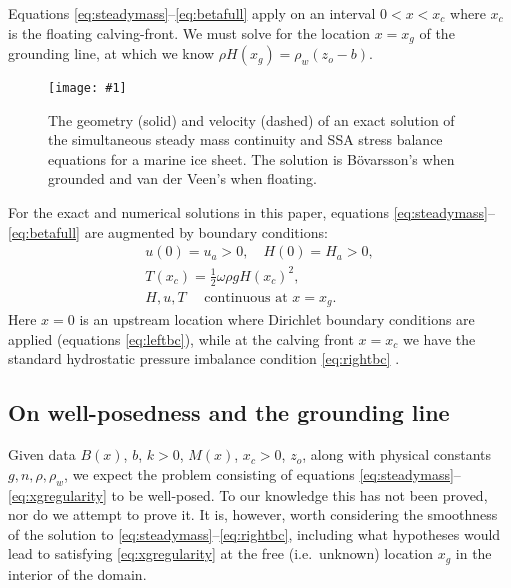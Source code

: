 \documentclass[twocolumn]{igs}
\renewcommand{\dh}{\fontencoding{T1}\selectfont{\symbol{240}}}
\newcommand{\onecol}[1]{\texttt{[image: \#1]}}
\newcommand{\bod}{B\"o\dh varsson\xspace}
\begin{document}
Equations \eqref{eq:steadymass}--\eqref{eq:betafull} apply on an interval $0 < x < x_c$ where $x_c$ is the floating calving-front.  We must solve for the location $x=x_g$ of the grounding line, at which we know $\rho H(x_g) = \rho_w (z_o - b)$.

\begin{figure}[ht]
\onecol{em-geometry}
\caption{The geometry (solid) and velocity (dashed) of an exact solution of the simultaneous steady mass continuity and SSA stress balance equations for a marine ice sheet.  The solution is \bod's when grounded and van der Veen's when floating.} \label{fig:exactmarine}
\end{figure}

For the exact and numerical solutions in this paper, equations \eqref{eq:steadymass}--\eqref{eq:betafull} are augmented by boundary conditions:
\begin{gather}
u(0) = u_a > 0, \quad H(0) = H_a > 0, \label{eq:leftbc} \\
T(x_c) = \frac{1}{2} \omega \rho g H(x_c)^2,  \label{eq:rightbc} \\
H, u, T \quad \text{ continuous at } x = x_g.  \label{eq:xgregularity}
\end{gather}
Here $x=0$ is an upstream location where Dirichlet boundary conditions are applied (equations \eqref{eq:leftbc}), while at the calving front $x=x_c$ we have the standard hydrostatic pressure imbalance condition \eqref{eq:rightbc} \citep{SchoofMarine1}.

\subsection*{On well-posedness and the grounding line}  Given data $B(x)$, $b$, $k>0$, $M(x)$, $x_c>0$, $z_o$, along with physical constants $g,n,\rho,\rho_w$, we expect the problem consisting of equations \eqref{eq:steadymass}--\eqref{eq:xgregularity} to be well-posed.  To our knowledge this has not been proved, nor do we attempt to prove it.  It is, however, worth considering the smoothness of the solution to \eqref{eq:steadymass}--\eqref{eq:rightbc}, including what hypotheses would lead to satisfying \eqref{eq:xgregularity} at the free (i.e.~unknown) location $x_g$ in the interior of the domain.
\end{document}
